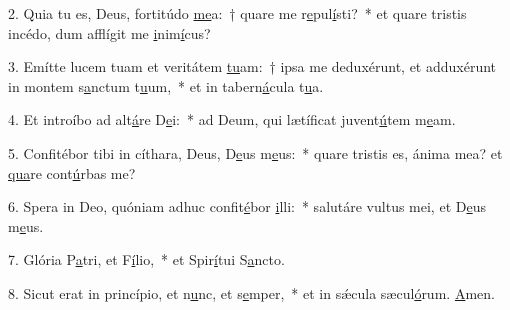 2. Quia tu es, Deus, fortitúdo \uline{me}a:~† quare me r\uline{e}pul\uline{í}sti?~* et quare tristis incédo, dum afflígit me \uline{i}nim\uline{í}cus?\par 
3. Emítte lucem tuam et veritátem \uline{tu}am:~† ipsa me deduxérunt, et adduxérunt in montem s\uline{a}nctum t\uline{u}um,~* et in tabern\uline{á}cula t\uline{u}a.\par 
4. Et introíbo ad alt\uline{á}re D\uline{e}i:~* ad Deum, qui lætíficat juvent\uline{ú}tem m\uline{e}am.\par 
5. Confitébor tibi in cíthara, Deus, D\uline{e}us m\uline{e}us:~* quare tristis es, ánima mea? et \uline{qua}re cont\uline{ú}rbas me?\par 
6. Spera in Deo, quóniam adhuc confit\uline{é}bor \uline{i}lli:~* salutáre vultus mei, et D\uline{e}us m\uline{e}us.\par 
7. Glória P\uline{a}tri, et F\uline{í}lio,~* et Spir\uline{í}tui S\uline{a}ncto.\par 
8. Sicut erat in princípio, et n\uline{u}nc, et s\uline{e}mper,~* et in sǽcula sæcul\uline{ó}rum. \uline{A}men.\par 
